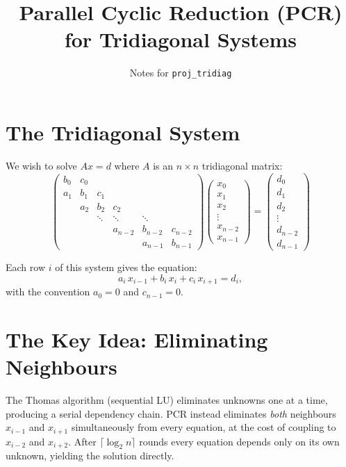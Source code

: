 \documentclass[11pt]{article}
\title{Parallel Cyclic Reduction (PCR) for Tridiagonal Systems}
\author{Notes for \texttt{proj\_tridiag}}
\date{}
\begin{document}
\maketitle

\section{The Tridiagonal System}

We wish to solve $Ax = d$ where $A$ is an $n \times n$ tridiagonal matrix:
\[
\begin{pmatrix}
b_0 & c_0 \\
a_1 & b_1 & c_1 \\
    & a_2 & b_2 & c_2 \\
    &     & \ddots & \ddots & \ddots \\
    &     &        & a_{n-2} & b_{n-2} & c_{n-2} \\
    &     &        &         & a_{n-1} & b_{n-1}
\end{pmatrix}
\begin{pmatrix}
x_0 \\ x_1 \\ x_2 \\ \vdots \\ x_{n-2} \\ x_{n-1}
\end{pmatrix}
=
\begin{pmatrix}
d_0 \\ d_1 \\ d_2 \\ \vdots \\ d_{n-2} \\ d_{n-1}
\end{pmatrix}
\]

Each row $i$ of this system gives the equation:
\begin{equation}\label{eq:row}
a_i \, x_{i-1} + b_i \, x_i + c_i \, x_{i+1} = d_i,
\end{equation}
with the convention $a_0 = 0$ and $c_{n-1} = 0$.

\section{The Key Idea: Eliminating Neighbours}

The Thomas algorithm (sequential LU) eliminates unknowns one at a time,
producing a serial dependency chain. PCR instead eliminates \emph{both}
neighbours $x_{i-1}$ and $x_{i+1}$ simultaneously from every equation,
at the cost of coupling to $x_{i-2}$ and $x_{i+2}$. After $\lceil \log_2 n \rceil$
rounds every equation depends only on its own unknown, yielding the solution directly.
\end{document}
